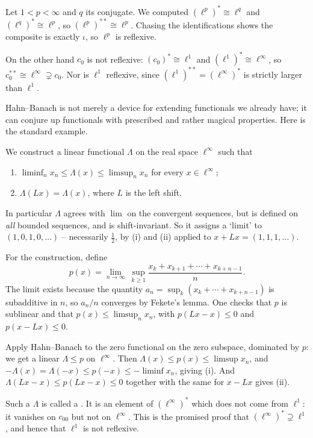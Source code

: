 \documentclass[a4paper]{scrartcl}
\begin{document}
\begin{example}
	Let $1 < p < \infty$ and $q$ its conjugate. We computed $(\ell^p)^* \cong \ell^q$ and $(\ell^q)^* \cong \ell^p$, so $(\ell^p)^{**} \cong \ell^p$. Chasing the identifications shows the composite is exactly $\iota$, so $\ell^p$ is reflexive.

	On the other hand $c_0$ is not reflexive: $(c_0)^* \cong \ell^1$ and $(\ell^1)^* \cong \ell^\infty$, so $c_0^{**} \cong \ell^\infty \supsetneq c_0$. Nor is $\ell^1$ reflexive, since $(\ell^1)^{**} = (\ell^\infty)^*$ is strictly larger than $\ell^1$.
\end{example}

Hahn--Banach is not merely a device for extending functionals we already have; it can conjure up functionals with prescribed and rather magical properties. Here is the standard example.

\begin{example}
	We construct a linear functional $\Lambda$ on the real space $\ell^\infty$ such that
	\begin{enumerate}[label=(\roman*)]
		\item $\liminf_n x_n \leq \Lambda(x) \leq \limsup_n x_n$ for every $x \in \ell^\infty$;
		\item $\Lambda(Lx) = \Lambda(x)$, where $L$ is the left shift.
	\end{enumerate}
	In particular $\Lambda$ agrees with $\lim$ on the convergent sequences, but is defined on \emph{all} bounded sequences, and is shift-invariant. So it assigns a `limit' to $(1,0,1,0,\dots)$ -- necessarily $\frac12$, by (i) and (ii) applied to $x + Lx = (1,1,1,\dots)$.

	For the construction, define
	$$p(x) = \lim_{n \to \infty}\ \sup_{k \geq 1} \frac{x_k + x_{k+1}+\cdots+x_{k+n-1}}{n}.$$
	The limit exists because the quantity $a_n = \sup_k(x_k + \cdots + x_{k+n-1})$ is subadditive in $n$, so $a_n/n$ converges by Fekete's lemma. One checks that $p$ is sublinear and that $p(x) \leq \limsup_n x_n$, with $p(Lx - x) \leq 0$ and $p(x - Lx)\leq 0$.

	Apply Hahn--Banach to the zero functional on the zero subspace, dominated by $p$: we get a linear $\Lambda \leq p$ on $\ell^\infty$. Then $\Lambda(x)\leq p(x)\leq\limsup x_n$, and $-\Lambda(x)=\Lambda(-x)\leq p(-x) \leq -\liminf x_n$, giving (i). And $\Lambda(Lx-x)\leq p(Lx-x)\leq0$ together with the same for $x - Lx$ gives (ii).

	Such a $\Lambda$ is called a . It is an element of $(\ell^\infty)^*$ which does not come from $\ell^1$: it vanishes on $c_{00}$ but not on $\ell^\infty$. This is the promised proof that $(\ell^\infty)^* \supsetneq \ell^1$, and hence that $\ell^1$ is not reflexive.
\end{example}
\end{document}

